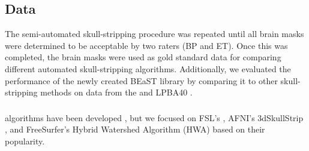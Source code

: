 \subsection*{Data \DIFdelbegin {}\DIFdelend \DIFaddbegin {}\DIFaddend }

The semi-automated skull-stripping procedure was repeated until all brain masks were determined to be acceptable by two raters (BP and ET). Once this was completed, the brain masks were used as gold standard data for comparing different automated skull-stripping algorithms.  Additionally, we evaluated the performance of the newly created BEaST library by comparing it to other skull-stripping methods on data from the \DIFdelbegin {}\DIFdelend \DIFaddbegin {}\DIFaddend \cite{IBSR} and \DIFdelbegin {}\DIFdelend \DIFaddbegin {}\DIFaddend LPBA40 \DIFdelbegin \DIFdel{) }\DIFdelend \cite{lpba40}.

\subsubsection*{\DIFdelbegin {}\DIFdelend \DIFaddbegin {}\DIFaddend }
\DIFdelbegin {}\DIFdelend \DIFaddbegin {}\DIFaddend algorithms have been developed \cite{Iglesias2011, MASS, Brainwash, Sadananthan2010, Lutkenhoff2014, Wang2014, pmid21195780, bse}, but we focused on FSL's \DIFdelbegin {}\DIFdelend \DIFaddbegin {}\DIFaddend \cite{Smith2002}, AFNI's 3dSkullStrip \cite{afni}, and FreeSurfer's Hybrid Watershed Algorithm (HWA) \cite{Segonne2004} based on their popularity.

